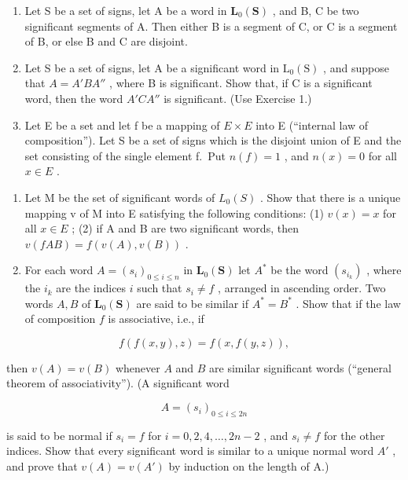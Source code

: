 \appendixexercisegroup

\begin{enumerate}
\def\labelenumi{\arabic{enumi}.}
\item
  Let S be a set of signs, let A be a word in \(\mathbf{L}_{0}(\mathbf{S})\) , and B, C be two significant segments of A. Then either B is a segment of C, or C is a segment of B, or else B and C are disjoint.
\item
  Let S be a set of signs, let A be a significant word in \(\mathrm{L}_{0}(\mathrm{S})\) , and suppose that \(A = A'BA''\) , where B is significant. Show that, if C is a significant word, then the word \(A'CA''\) is significant. (Use Exercise 1.)
\item
  Let E be a set and let f be a mapping of \(E \times E\) into E (``internal law of composition''). Let S be a set of signs which is the disjoint union of E and the set consisting of the single element f.~Put \(n(f) = 1\) , and \(n(x) = 0\) for all \(x \in E\) .
\end{enumerate}

\begin{enumerate}
\def\labelenumi{(\alph{enumi})}
\item
  Let M be the set of significant words of \(L_{0}(S)\) . Show that there is a unique mapping v of M into E satisfying the following conditions: (1) \(v(x) = x\) for all \(x \in E\) ; (2) if A and B are two significant words, then \(v(fAB) = f(v(A), v(B))\) .
\item
  For each word \(A = (s_i)_{0 \leqslant i \leqslant n}\) in \(\mathbf{L}_0(\mathbf{S})\) let \(A^*\) be the word \((s_{i_k})\) , where the \(i_k\) are the indices \(i\) such that \(s_i \neq f\) , arranged in ascending order. Two words \(A, B\) of \(\mathbf{L}_0(\mathbf{S})\) are said to be similar if \(A^* = B^*\) . Show that if the law of composition \(f\) is associative, i.e., if
\end{enumerate}

\[
f (f (x, y), z) = f (x, f (y, z)),
\]

then \(v(A) = v(B)\) whenever \(A\) and \(B\) are similar significant words (``general theorem of associativity''). (A significant word

\[
A = (s _ {i}) _ {0 \leqslant i \leqslant 2 n}
\]

is said to be normal if \(s_{i}=f\) for \(i=0,2,4,\ldots,2n-2\) , and \(s_{i}\neq f\) for the other indices. Show that every significant word is similar to a unique normal word \(A'\) , and prove that \(v(A)=v(A')\) by induction on the length of A.)

